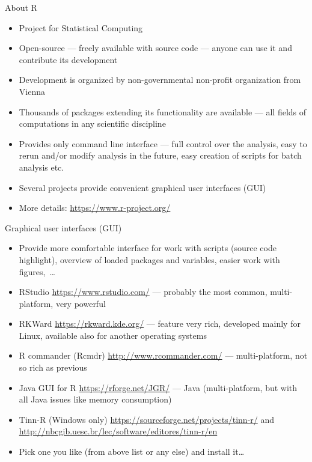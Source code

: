 \documentclass[compress, ucs, xelatex, 11pt, xcolor=svgnames,
  hyperref={
    bookmarks=true,
    unicode=true,
    colorlinks=true,
    pdftitle={Molecular data in R},
    plainpages=false,
    pdfauthor={Vojtech Zeisek},
    pdfsubject={Course about phylogeny and evolution in R},
    pdfcreator={XeLaTeX},
    pdfkeywords={R, evolution, phylogeny, molecular data},
    linkcolor=Tomato,
    anchorcolor=SaddleBrown,
    citecolor=Goldenrod,
    filecolor=DarkMagenta,
    menucolor=Sienna,
    urlcolor=DarkTurquoise,
    pdftex},
  url={hyphens, lowtilde} %
  ]{beamer}
\begin{document}
\begin{frame}{About R}
  \begin{itemize}
    \item Project for Statistical Computing
    \item Open-source --- freely available with source code --- anyone can use it and contribute its development
    \item Development is organized by non-governmental non-profit organization from Vienna
    \item Thousands of packages extending its functionality are available --- all fields of computations in any scientific discipline
    \item Provides only command line interface --- full control over the analysis, easy to rerun and/or modify analysis in the future, easy creation of scripts for batch analysis etc.
    \item Several projects provide convenient graphical user interfaces (GUI)
    \item More details: \url{https://www.r-project.org/}
  \end{itemize}
\end{frame}

\begin{frame}{Graphical user interfaces (GUI)}
  \begin{itemize}
    \item Provide more comfortable interface for work with scripts (source code highlight), overview of loaded packages and variables, easier work with figures,~\ldots
    \item RStudio \url{https://www.rstudio.com/} --- probably the most common, multi-platform, very powerful
    \item RKWard \url{https://rkward.kde.org/} --- feature very rich, developed mainly for Linux, available also for another operating systems
    \item R commander (Rcmdr) \url{http://www.rcommander.com/} --- multi-platform, not so rich as previous
    \item Java GUI for R \url{https://rforge.net/JGR/} --- Java (multi-platform, but with all Java issues like memory consumption)
    \item Tinn-R (Windows only) \url{https://sourceforge.net/projects/tinn-r/} and \url{http://nbcgib.uesc.br/lec/software/editores/tinn-r/en}
    \item Pick one you like (from above list or any else) and install it\ldots
  \end{itemize}
\end{frame}
\end{document}
